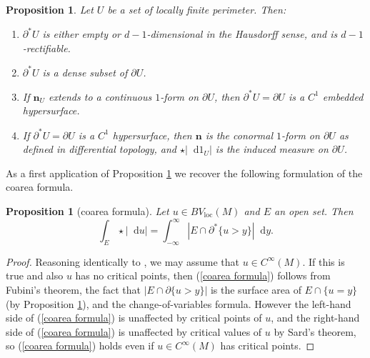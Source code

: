 \documentclass[reqno,10pt]{amsart}
\DeclareMathOperator{\supp}{supp}
\newcommand*\dif{\mathop{}\!\mathrm{d}}
\newcommand{\normal}{\mathbf n}
\newcommand{\loc}{\mathrm{loc}}
\newtheorem{proposition}[theorem]{Proposition}
\theoremstyle{definition}
\numberwithin{equation}{section}
\begin{document}
\begin{proposition}\label{locality of Caccioppoli}
    Let $U$ be a set of locally finite perimeter.
    Then:
    \begin{enumerate}
    \item $\partial^* U$ is either empty or $d-1$-dimensional in the Hausdorff sense, and is $d-1$-rectifiable.
    \item $\partial^* U$ is a dense subset of $\partial U$.
    \item If $\normal_U$ extends to a continuous $1$-form on $\partial U$, then $\partial^* U = \partial U$ is a $C^1$ embedded hypersurface.
    \item If $\partial^* U = \partial U$ is a $C^1$ hypersurface, then $\normal$ is the conormal $1$-form on $\partial U$ as defined in differential topology, and $\star |\dif 1_U|$ is the induced measure on $\partial U$.
\end{enumerate}
\end{proposition}

As a first application of Proposition \ref{locality of Caccioppoli} we recover the following formulation of the coarea formula.

\begin{proposition}[coarea formula]\label{Coarea2}
Let $u \in BV_\loc(M)$ and $E$ an open set. Then
\begin{equation}\label{coarea formula}
\int_E \star |\dif u| = \int_{-\infty}^\infty |E \cap \partial^* \{u > y\}| \dif y.
\end{equation}
\end{proposition}
\begin{proof}
Reasoning identically to \cite[Theorem 1.23]{Giusti77}, we may assume that $u \in C^\infty(M)$.
If this is true and also $u$ has no critical points, then (\ref{coarea formula}) follows from Fubini's theorem, the fact that $|E \cap \partial \{u > y\}|$ is the surface area of $E \cap \{u = y\}$ (by Proposition \ref{locality of Caccioppoli}), and the change-of-variables formula.
However the left-hand side of (\ref{coarea formula}) is unaffected by critical points of $u$, and the right-hand side of (\ref{coarea formula}) is unaffected by critical values of $u$ by Sard's theorem, so (\ref{coarea formula}) holds even if $u \in C^\infty(M)$ has critical points.
\end{proof}
\end{document}
